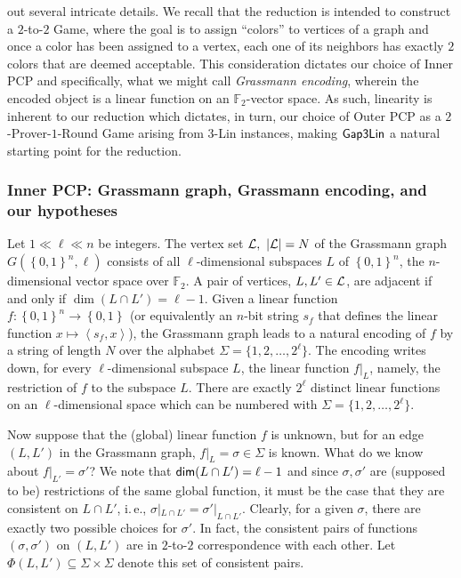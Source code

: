 \documentclass[11pt]{article}
\numberwithin{equation}{section}
\theoremstyle{definition}
\theoremstyle{plain}
\newcommand{\ie}{i.\,e.}
\newcommand\set[1]{{\left\{ #1 \right\}}}
\newcommand\power[1]{\set{0,1}^{#1}}
\begin{document}
out several intricate details.
We recall that the reduction is
intended to construct a $2$-to-$2$ Game, where the goal is to assign ``colors'' to vertices
of a graph and once a color %
has been  %
assigned to
a vertex, each one of its neighbors has exactly $2$ colors
%
%
%
that are deemed acceptable.
This consideration dictates our choice of Inner PCP and
specifically,
what we might call \emph{Grassmann encoding}, %
%
wherein the encoded object is a linear function on
an %
%
${\mathbb F}_2$-vector space.
As such, linearity is inherent to
our reduction which dictates, in turn, our choice of Outer PCP as a $2$-Prover-$1$-Round
Game arising from $3$-Lin instances, making
%
%
${\sf Gap3Lin}$ a natural starting point for the reduction.

%
\subsubsection{Inner PCP: Grassmann graph, Grassmann encoding, and our hypotheses}

Let $1 \ll \ell \ll n$ be integers. The vertex set ${\cal L}, ~|{\cal L}|=N$ 
 of the Grassmann graph $G(\power{n}, \ell)$ consists of all $\ell$-dimensional subspaces $L$ of $\power{n}$, the $n$-dimensional vector space over ${\mathbb F}_2$.
 A pair of vertices, $L, L' \in {\cal L}$, %
%
are %
adjacent  %
if and only if ${\dim}(L \cap L')= \ell-1$. Given a linear function $f: \power{n}\to\power{}$ (or equivalently
an $n$-bit string $s_f$ that defines the linear function $x \mapsto \left< s_f, x \right>$), the Grassmann graph leads to a natural encoding of $f$  by a string of
length $N$ over the alphabet $\Sigma =
\{1,2,\ldots, 2^\ell\}$.  The encoding writes down, for every $\ell$-dimensional
subspace $L$, the linear function $f|_L$, namely, the restriction of $f$ to the subspace $L$. There are exactly $2^\ell$ distinct linear functions on an $\ell$-dimensional
space which can be numbered with $\Sigma = \{1,2,\ldots,2^\ell\}$.

Now suppose that the (global) linear function $f$ is unknown, but for an edge $(L, L')$ in the Grassmann graph, $f|_L = \sigma \in \Sigma$ is known. What do we know
about $f|_{L'} = \sigma'$?  We note that ${\sf dim}(L \cap L')=\ell-1$ and since $\sigma, \sigma'$ are (supposed to be)
restrictions of the same global function, it must be the case that they are consistent on $L\cap L'$, \ie,
$\sigma|_{L\cap L'} = {\sigma'}|_{L\cap L'}$. Clearly, for a given $\sigma$, there
are exactly two possible choices for $\sigma'$.
In fact, the
%
consistent pairs %
%
of functions $(\sigma, \sigma')$ on $(L, L')$
%
%
%
%
%
%
%
%
%
%
%
%
%
are in $2$-to-$2$ correspondence with each other.
Let $\Phi(L,L') \subseteq \Sigma \times \Sigma$ denote this set of consistent pairs.
\end{document}
